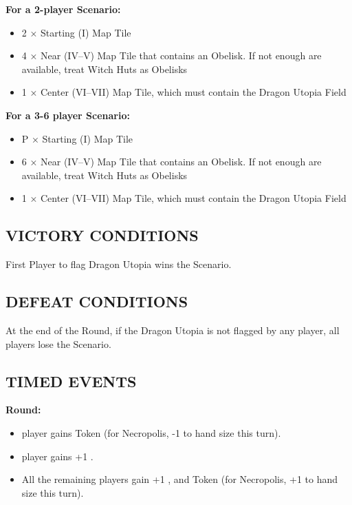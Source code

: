 \begin{multicols}{2}
\textbf{For a 2-player Scenario:}
\begin{itemize}
  \item 2 × Starting (I) Map Tile
  \item 4 × Near (IV--V) Map Tile that contains an Obelisk. If not enough are available, treat Witch Huts as Obelisks
  \item 1 × Center (VI--VII) Map Tile, which must contain the Dragon Utopia Field
\end{itemize}

\textbf{For a 3-6 player Scenario:}
\begin{itemize}
  \item P × Starting (I) Map Tile
  \item 6 × Near (IV--V) Map Tile that contains an Obelisk. If not enough are available, treat Witch Huts as Obelisks
  \item 1 × Center (VI--VII) Map Tile, which must contain the Dragon Utopia Field
\end{itemize}

\subsection*{\MakeUppercase{Victory Conditions}}
First Player to flag Dragon Utopia wins the Scenario.

\subsection*{\MakeUppercase{Defeat Conditions}}
At the end of the  Round, if the Dragon Utopia is not flagged by any player, all players lose the Scenario.

\begin{center}
\end{center}

\subsection*{\MakeUppercase{Timed Events}}

\textbf{ Round:}
\begin{itemize}
  \item {} player gains  Token (for Necropolis, -1 to hand size this turn).
  \item {} player gains +1 .
  \item All the remaining players gain +1 , and  Token (for Necropolis, +1 to hand size this turn).
\end{itemize}


\end{multicols}
